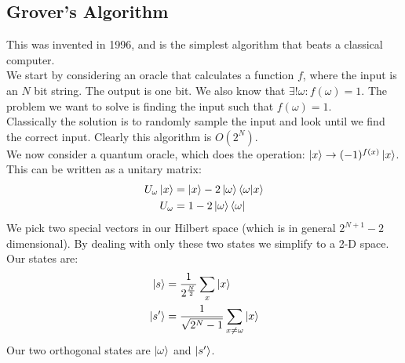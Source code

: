 \subsection{Grover's Algorithm}
This was invented in 1996, and is the simplest algorithm that beats a classical computer.\\
We start by considering an oracle that calculates a function $f$, where the input is an $N$ bit string. The output is one bit. We also know that $\exists! \omega : f(\omega) = 1$. The problem we want to solve is finding the input such that $f(\omega) = 1$. \\
Classically the solution is to randomly sample the input and look until we find the correct input. Clearly this algorithm is $O(2^N)$. \\
We now consider a quantum oracle, which does the operation: $\ket{x} \to (-1)^{f(x)} \ket{x}$. \\
This can be written as a unitary matrix:
\begin{align*}
	U_\omega\ket{x} &= \ket{x} - 2\ket{\omega}\bra{\omega}\ket{x} \\
	U_\omega &= 1 - 2\ket{\omega}\bra{\omega}
\end{align*}
We pick two special vectors in our Hilbert space (which is in general $2^{N+1} -2$ dimensional). By dealing with only these two states we simplify to a 2-D space. Our states are:
\begin{align*}
	\ket{s} &= \frac{1}{2^\frac{N}{2}} \sum_x \ket{x} \\
	\ket{s'} &= \frac{1}{\sqrt{2^N-1}} \sum_{x\neq\omega} \ket{x}
\end{align*}
Our two orthogonal states are $\ket{\omega}$ and $\ket{s'}$.

